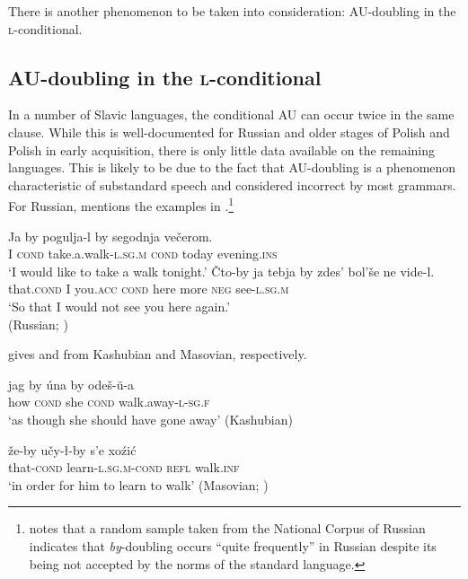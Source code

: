 \documentclass[output=paper]{langscibook}
\begin{document}
There is another phenomenon to be taken into consideration: AU-doubling in the \textsc{l-}conditional.


\subsection{AU-doubling in the \textsc{l-}conditional}\label{pitsch:sec:doubling}

In a number of Slavic languages, the conditional AU can occur twice in the same clause. While this is well-documented for Russian and older stages of Polish and Polish in early acquisition, there is only little data available on the remaining languages. This is likely to be due to the fact that AU-doubling is a phenomenon characteristic of substandard speech and considered incorrect by most grammars. For Russian, \citet{Xrakovskij2009} mentions the examples in .\footnote{\citet[331]{Hansen2010} notes that a random sample taken from the National Corpus of Russian indicates that \textit{by}-doubling occurs ``quite frequently'' in Russian despite its being not accepted by the norms of the standard language.}

\ea
\ea\gll Ja by pogulja-l by segodnja večerom. \\
I \textsc{cond} take.a.walk-\textsc{l.sg.m} \textsc{cond} today evening.\textsc{ins} \\
\glt `I would like to take a walk tonight.'  \label{pitsch:ex:doubling_Russian_a}
\ex\gll Čto-by ja tebja by zdes' bol'še ne vide-l. \\
that.\textsc{cond} I you.\textsc{acc} \textsc{cond} here more \textsc{neg} see-\textsc{l.sg.m} \\
\glt `So that I would not see you here again.' \\ \hfill (Russian; \citealt[277]{Xrakovskij2009}) \label{pitsch:ex:doubling_Russian_b}
\z
\label{pitsch:ex:doubling_Russian}
\z

\noindent \citet{Rittel1973} gives  and  from Kashubian and Masovian, respectively.

\ea\gll
jag by úna by odeš-ŭ-a \\
how \textsc{cond} she \textsc{cond} walk.away\textsc{-l-sg.f} \\ 
\glt `as though she should have gone away' \hfill (Kashubian)
\label{pitsch:ex:doubling_Kashubian}
\z

\ea\gll že-by učy-ł-by s'e xoźić \\
that-\textsc{cond} learn\textsc{-l.sg.m-cond} \textsc{refl} walk.\textsc{inf} \\ 
\glt `in order for him to learn to walk' \hfill (Masovian; \citealt[146]{Rittel1973})
\label{pitsch:ex:doubling_Masovian}
\z
\end{document}

